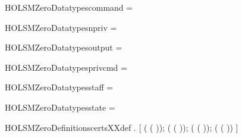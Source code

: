 \newcommand{\HOLSMZeroDate}{09 April 2019}
\newcommand{\HOLSMZeroTime}{18:18}
\begin{SaveVerbatim}{HOLSMZeroDatatypescommand}
 =   \HOLTokenBar{}  
\end{SaveVerbatim}
\newcommand{\HOLSMZeroDatatypescommand}{\UseVerbatim{HOLSMZeroDatatypescommand}}
\begin{SaveVerbatim}{HOLSMZeroDatatypesnpriv}
 = 
\end{SaveVerbatim}
\newcommand{\HOLSMZeroDatatypesnpriv}{\UseVerbatim{HOLSMZeroDatatypesnpriv}}
\begin{SaveVerbatim}{HOLSMZeroDatatypesoutput}
 =  \HOLTokenBar{} 
\end{SaveVerbatim}
\newcommand{\HOLSMZeroDatatypesoutput}{\UseVerbatim{HOLSMZeroDatatypesoutput}}
\begin{SaveVerbatim}{HOLSMZeroDatatypesprivcmd}
 =  \HOLTokenBar{} 
\end{SaveVerbatim}
\newcommand{\HOLSMZeroDatatypesprivcmd}{\UseVerbatim{HOLSMZeroDatatypesprivcmd}}
\begin{SaveVerbatim}{HOLSMZeroDatatypesstaff}
 =  \HOLTokenBar{}  \HOLTokenBar{} 
\end{SaveVerbatim}
\newcommand{\HOLSMZeroDatatypesstaff}{\UseVerbatim{HOLSMZeroDatatypesstaff}}
\begin{SaveVerbatim}{HOLSMZeroDatatypesstate}
 =  \HOLTokenBar{} 
\end{SaveVerbatim}
\newcommand{\HOLSMZeroDatatypesstate}{\UseVerbatim{HOLSMZeroDatatypesstate}}
\newcommand{\HOLSMZeroDatatypes}{
\HOLSMZeroDatatypescommand\HOLSMZeroDatatypesnpriv\HOLSMZeroDatatypesoutput\HOLSMZeroDatatypesprivcmd\HOLSMZeroDatatypesstaff\HOLSMZeroDatatypesstate}
\begin{SaveVerbatim}{HOLSMZeroDefinitionscertsXXdef}
\HOLTokenTurnstile{} \HOLSymConst{\HOLTokenForall{}}  .
         \HOLSymConst{=}
     [    ( ( ));
          ( ( ));
          ( ( ));
          ( ( ))   ]
\end{SaveVerbatim}
